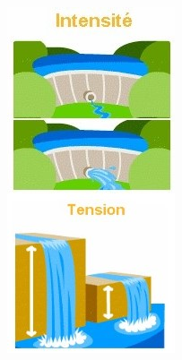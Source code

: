 \documentclass[11pt,a4paper]{article}
\begin{document}
\begingroup
\begin{figure}
    \centering
    \includegraphics[width=0.85\linewidth]{imgs/p7/analogie.jpg}
\end{figure}
\end{document}

